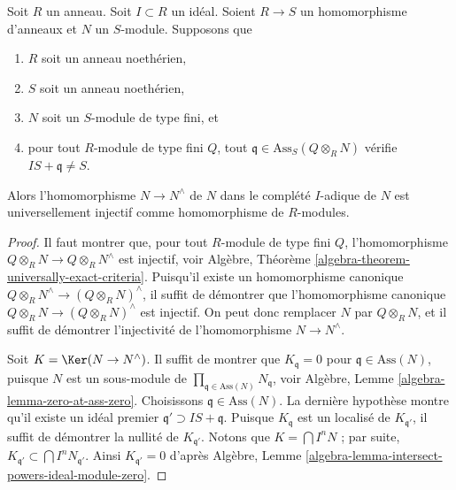 \begin{lemma}
\label{lemma-universally-injective-to-completion}
Soit $R$ un anneau.
Soit $I \subset R$ un idéal.
Soient $R \to S$ un homomorphisme d'anneaux et $N$ un $S$-module.
Supposons que
\begin{enumerate}
\item $R$ soit un anneau noethérien,
\item $S$ soit un anneau noethérien,
\item $N$ soit un $S$-module de type fini, et
\item pour tout $R$-module de type fini $Q$, tout
$\mathfrak q \in \text{Ass}_S(Q \otimes_R N)$
vérifie $IS + \mathfrak q \not = S$.
\end{enumerate}
Alors l'homomorphisme $N \to N^\wedge$ de $N$ dans le complété $I$-adique de $N$
est universellement injectif comme homomorphisme de $R$-modules.
\end{lemma}

\begin{proof}
Il faut montrer que, pour tout $R$-module de type fini $Q$, l'homomorphisme
$Q \otimes_R N \to Q \otimes_R N^\wedge$ est injectif, voir
Algèbre, Théorème \ref{algebra-theorem-universally-exact-criteria}.
Puisqu'il existe un homomorphisme canonique $Q \otimes_R N^\wedge \to (Q \otimes_R N)^\wedge$,
il suffit de démontrer que l'homomorphisme canonique
$Q \otimes_R N \to (Q \otimes_R N)^\wedge$ est injectif.
On peut donc remplacer $N$ par $Q \otimes_R N$, et il suffit de démontrer
l'injectivité de l'homomorphisme $N \to N^\wedge$.

\medskip\noindent
Soit $K = \Ker(N \to N^\wedge)$. Il suffit de montrer que
$K_{\mathfrak q} = 0$ pour $\mathfrak q \in \text{Ass}(N)$, puisque $N$ est un
sous-module de $\prod_{\mathfrak q \in \text{Ass}(N)} N_{\mathfrak q}$, voir
Algèbre, Lemme \ref{algebra-lemma-zero-at-ass-zero}.
Choisissons $\mathfrak q \in \text{Ass}(N)$. La dernière hypothèse montre
qu'il existe un idéal premier $\mathfrak q' \supset IS + \mathfrak q$.
Puisque $K_{\mathfrak q}$ est un localisé de $K_{\mathfrak q'}$,
il suffit de démontrer la nullité de $K_{\mathfrak q'}$.
Notons que $K = \bigcap I^nN$ ; par suite,
$K_{\mathfrak q'} \subset \bigcap I^nN_{\mathfrak q'}$.
Ainsi $K_{\mathfrak q'} = 0$ d'après
Algèbre, Lemme \ref{algebra-lemma-intersect-powers-ideal-module-zero}.
\end{proof}


